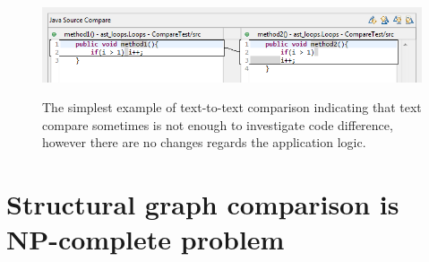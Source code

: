 \documentclass{report}
\begin{document}
\begin{figure}[h]
  \centering
  \includegraphics[scale=0.6]{Figures/introduction/intro-code-example}\\[0.1cm]
  \caption[Simple textual comparison example in Eclipse compare editor]{The simplest example of text-to-text comparison indicating that text compare sometimes is not enough to investigate code difference, however there are no changes regards the application logic.}
  \label{fig:intro-code-example}
\end{figure}

\section{Structural graph comparison is NP-complete problem}
\end{document}
